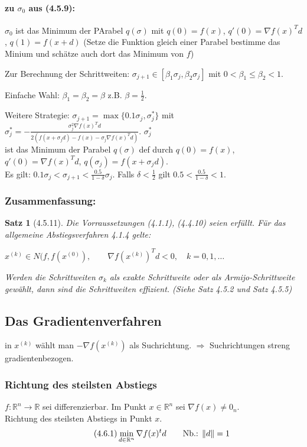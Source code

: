 \documentclass[ngerman,halfparskip]{scrartcl}
\DeclarePairedDelimiter{\norm}{\lVert}{\rVert}
\newtheorem*{satz}{Satz}
\theoremstyle{definition}
\newcommand*{\R}{\mathbb{R}}      %
\begin{document}
\paragraph*{zu $\sigma_0$ aus (4.5.9):} $\sigma_0$ ist das Minimum der PArabel $q(\sigma)$ mit $q(0)=f(x)$, $q'(0)=\nabla f(x)^Td$, $q(1)=f(x+d)$ (Setze die Funktion gleich einer Parabel bestimme das Minium und schätze auch dort das Minimum von $f$)

Zur Berechnung der Schrittweiten: $\sigma_{j+1}\in [\beta_1\sigma_j,\beta_2\sigma_j]$ mit $0<\beta_1\leq\beta_2<1$.

Einfache Wahl: $\beta_1=\beta_2=\beta$ z.B. $\beta=\frac 12$. 

Weitere Strategie: $\sigma_{j+1}=\max \{0.1 \sigma_j, \sigma_j^*\}$ mit $\sigma_j^*=-\frac{\sigma_j^2 \nabla f(x)^Td}{2(f(x+\sigma_jd)-f(x)-\sigma_j\nabla f(x)^Td)}$. $\sigma_j^*$ \\ist das Minimum der Parabel $q(\sigma)$ def durch $q(0)=f(x)$, $q'(0)=\nabla f(x)^Td$, $q(\sigma_j)=f(x+\sigma_jd)$. \\Es gilt: $0.1\sigma_j<\sigma_{j+1}<\frac{0.5}{1-\delta}\sigma_j$. Falls $\delta < \frac 12$ gilt $0.5 < \frac{0.5}{1-\delta}<1$.

\subsubsection*{Zusammenfassung:}
\begin{satz}[4.5.11]
Die Vorraussetzungen (4.1.1), (4.4.10) seien erfüllt. Für das allgemeine Abstiegsverfahren 4.1.4 gelte:

$x^{(k)}\in N(f,f(x^{(0)}), \qquad \nabla f (x^{(k)})^Td<0, \quad k=0, 1, \ldots$

Werden die Schrittweiten $\sigma_k$ als exakte Schrittweite oder als Armijo-Schrittweite gewählt, dann sind die Schrittweiten effizient. (Siehe Satz 4.5.2 und Satz 4.5.5)
\end{satz}

\subsection{Das Gradientenverfahren}
in $x^{(k)}$ wählt man $-\nabla f(x^{(k)})$ als Suchrichtung. $\Rightarrow$ Suchrichtungen streng gradientenbezogen.

\subsubsection{Richtung des steilsten Abstiegs} 
$f\colon \R^n\rightarrow \R$ sei differenzierbar. Im Punkt $x\in\R^n$ sei $\nabla f(x)\neq 0_n$.\\
Richtung des steilsten Abstiegs in Punkt $x$.
\begin{gather*}\tag{4.6.1}
\min\limits_{d\in\R^n}\nabla f(x)^td \qquad \text{Nb.: }\norm{d}=1
\end{gather*}
\end{document}

